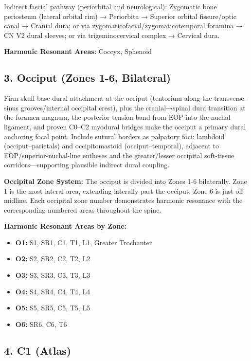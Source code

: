 \documentclass[11pt,letterpaper]{article}
\begin{document}
Indirect fascial pathway (periorbital and neurological): Zygomatic bone periosteum (lateral orbital rim) → Periorbita → Superior orbital fissure/optic canal → Cranial dura; or via zygomaticofacial/zygomaticotemporal foramina → CN V2 dural sleeves; or via trigeminocervical complex → Cervical dura.


\textbf{Harmonic Resonant Areas:} Coccyx, Sphenoid


\subsection{3. Occiput (Zones 1-6, Bilateral)}

Firm skull-base dural attachment at the occiput (tentorium along the transverse-sinus grooves/internal occipital crest), plus the cranial→spinal dura transition at the foramen magnum, the posterior tension band from EOP into the nuchal ligament, and proven C0–C2 myodural bridges make the occiput a primary dural anchoring focal point. Include sutural borders as palpatory foci: lambdoid (occiput–parietals) and occipitomastoid (occiput–temporal), adjacent to EOP/superior-nuchal-line entheses and the greater/lesser occipital soft-tissue corridors—supporting plausible indirect dural coupling.


\textbf{Occipital Zone System:} The occiput is divided into Zones 1-6 bilaterally. Zone 1 is the most lateral area, extending laterally past the occiput. Zone 6 is just off midline. Each occipital zone number demonstrates harmonic resonance with the corresponding numbered areas throughout the spine.


\textbf{Harmonic Resonant Areas by Zone:}

\begin{itemize}
\item \textbf{O1:} S1, SR1, C1, T1, L1, Greater Trochanter
\item \textbf{O2:} S2, SR2, C2, T2, L2
\item \textbf{O3:} S3, SR3, C3, T3, L3
\item \textbf{O4:} S4, SR4, C4, T4, L4
\item \textbf{O5:} S5, SR5, C5, T5, L5
\item \textbf{O6:} SR6, C6, T6
\end{itemize}


\subsection{4. C1 (Atlas)}
\end{document}
